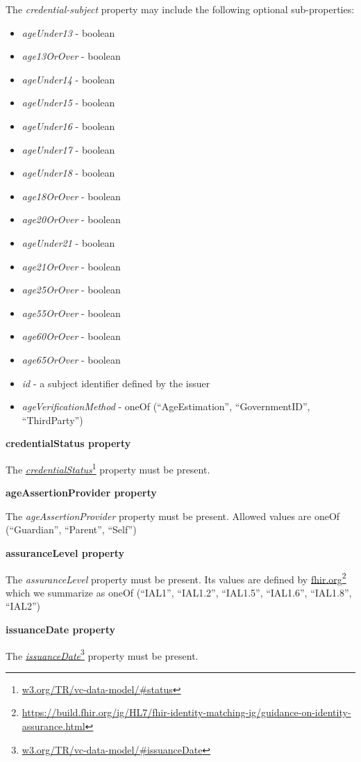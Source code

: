 \documentclass[11pt, oneside]{article}   	%
\newcommand{\hyperfootnote}[1][]{\def\ArgI{{#1}}\hyperfootnoteRelay}
\newcommand\hyperfootnoteRelay[2][]{\href{#1#2}{\ArgI}\footnote{\href{#1#2}{#2}}}
\begin{document}
The \emph{credential-subject} property may include the following optional sub-properties:
\begin{itemize}
	\item \emph{ageUnder13} - boolean
	\item \emph{age13OrOver} - boolean
	\item \emph{ageUnder14} - boolean
	\item \emph{ageUnder15} - boolean
	\item \emph{ageUnder16} - boolean
	\item \emph{ageUnder17} - boolean
	\item \emph{ageUnder18} - boolean
	\item \emph{age18OrOver} - boolean
	\item \emph{age20OrOver} - boolean
	\item \emph{ageUnder21} - boolean
	\item \emph{age21OrOver} - boolean
	\item \emph{age25OrOver} - boolean
	\item \emph{age55OrOver} - boolean
	\item \emph{age60OrOver} - boolean
	\item \emph{age65OrOver} - boolean
	\item \emph{id} - a subject identifier defined by the issuer
	\item \emph{ageVerificationMethod} - oneOf (``AgeEstimation'', ``GovernmentID'', ``ThirdParty'')
\end{itemize}

\textbf{credentialStatus property}

The \hyperfootnote[\emph{credentialStatus}][https://]{w3.org/TR/vc-data-model/\#status} property must be present.

\textbf{ageAssertionProvider property}

The \emph{ageAssertionProvider} property must be present. Allowed values are oneOf (``Guardian'', ``Parent'', ``Self'')

\textbf{assuranceLevel property}

The \emph{assuranceLevel} property must be present. Its values are defined by \hyperfootnote[fhir.org][https://]{https://build.fhir.org/ig/HL7/fhir-identity-matching-ig/guidance-on-identity-assurance.html} which we summarize as oneOf (``IAL1'', ``IAL1.2'', ``IAL1.5'', ``IAL1.6'', ``IAL1.8'', ``IAL2'')

\textbf{issuanceDate property}

The \hyperfootnote[\emph{issuanceDate}][https://]{w3.org/TR/vc-data-model/\#issuanceDate} property must be present.
\end{document}
